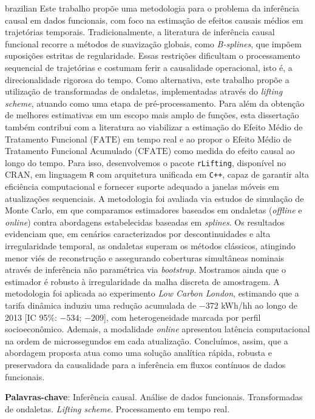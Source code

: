 \setlength{\absparsep}{18pt} %
\begin{resumo}[Resumo]
 \begin{otherlanguage*}{brazilian}
    Este trabalho propõe uma metodologia para o problema da inferência causal em dados funcionais, com foco na estimação de efeitos causais médios em trajetórias temporais.
    Tradicionalmente, a literatura de inferência causal funcional recorre a métodos de suavização globais, como \emph{B-splines}, que impõem suposições estritas de regularidade.
    Essas restrições dificultam o processamento sequencial de trajetórias e costumam ferir a causalidade operacional, isto é, a direcionalidade rigorosa do tempo.
    Como alternativa, este trabalho propõe a utilização de transformadas de ondaletas, implementadas através do \emph{lifting scheme}, atuando como uma etapa de pré-processamento.
    Para além da obtenção de melhores estimativas em um escopo mais amplo de funções, esta dissertação também contribui com a literatura ao viabilizar a estimação do Efeito Médio de Tratamento Funcional (\(\mathrm{FATE}\)) em tempo real e ao propor o Efeito Médio de Tratamento Funcional Acumulado (\(\mathrm{CFATE}\)) como medida do efeito causal ao longo do tempo. 
    Para isso, desenvolvemos o pacote \texttt{rLifting}, disponível no CRAN, em linguagem \texttt{R} com arquitetura unificada em \texttt{C++}, capaz de garantir alta eficiência computacional e fornecer suporte adequado a janelas móveis em atualizações sequenciais. 
    A metodologia foi avaliada via estudos de simulação de Monte Carlo, em que comparamos estimadores baseados em ondaletas (\emph{offline} e \emph{online}) contra abordagens estabelecidas baseadas em \emph{splines}. 
    Os resultados evidenciam que, em cenários caracterizados por descontinuidades e alta irregularidade temporal, as ondaletas superam os métodos clássicos, atingindo menor viés de reconstrução e assegurando coberturas simultâneas nominais através de inferência não paramétrica via \emph{bootstrap}. 
    Mostramos ainda que o estimador é robusto à irregularidade da malha discreta de amostragem. 
    A metodologia foi aplicada ao experimento \emph{Low Carbon London}, estimando que a tarifa dinâmica induziu uma redução acumulada de \(-372\) kWh/hh ao longo de 2013 [IC 95\%: \(-534\); \(-209\)], com heterogeneidade marcada por perfil socioeconômico. 
    Ademais, a modalidade \emph{online} apresentou latência computacional na ordem de microssegundos em cada atualização. 
    Concluímos, assim, que a abordagem proposta atua como uma solução analítica rápida, robusta e preservadora da causalidade para a inferência em fluxos contínuos de dados funcionais.

    \textbf{Palavras-chave}: Inferência causal. Análise de dados funcionais. Transformadas de ondaletas. \emph{Lifting scheme}. Processamento em tempo real.
 \end{otherlanguage*}
\end{resumo}
